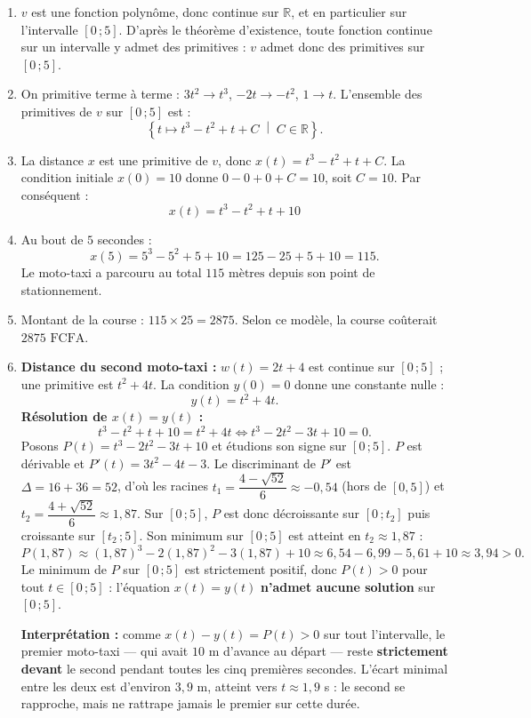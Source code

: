\documentclass[11pt]{article}
\begin{document}
\begin{corrige}
\begin{enumerate}
\item $v$ est une fonction polynôme, donc continue sur $\mathbb{R}$, et en particulier sur l'intervalle $[0\,;5]$. D'après le théorème d'existence, toute fonction continue sur un intervalle y admet des primitives : $v$ admet donc des primitives sur $[0\,;5]$.
\item On primitive terme à terme : $3t^2 \to t^3$, $-2t \to -t^2$, $1 \to t$. L'ensemble des primitives de $v$ sur $[0\,;5]$ est :
\[ \left\{ t \mapsto t^3 - t^2 + t + C \;\middle|\; C \in \mathbb{R} \right\}. \]
\item La distance $x$ est une primitive de $v$, donc $x(t) = t^3 - t^2 + t + C$. La condition initiale $x(0) = 10$ donne $0 - 0 + 0 + C = 10$, soit $C = 10$. Par conséquent :
\[ \boxed{x(t) = t^3 - t^2 + t + 10} \]
\item Au bout de $5$ secondes :
\[ x(5) = 5^3 - 5^2 + 5 + 10 = 125 - 25 + 5 + 10 = 115. \]
Le moto-taxi a parcouru au total $\boxed{115 \text{ mètres}}$ depuis son point de stationnement.
\item Montant de la course : $115 \times 25 = 2875$. Selon ce modèle, la course coûterait $\boxed{2875 \text{ FCFA}}$.
\item \textbf{Distance du second moto-taxi :} $w(t) = 2t + 4$ est continue sur $[0\,;5]$ ; une primitive est $t^2 + 4t$. La condition $y(0) = 0$ donne une constante nulle :
\[ y(t) = t^2 + 4t. \]
\textbf{Résolution de $x(t) = y(t)$ :}
\[ t^3 - t^2 + t + 10 = t^2 + 4t \iff t^3 - 2t^2 - 3t + 10 = 0. \]
Posons $P(t) = t^3 - 2t^2 - 3t + 10$ et étudions son signe sur $[0\,;5]$. $P$ est dérivable et $P'(t) = 3t^2 - 4t - 3$. Le discriminant de $P'$ est $\Delta = 16 + 36 = 52$, d'où les racines $t_1 = \dfrac{4 - \sqrt{52}}{6} \approx -0,54$ (hors de $[0,5]$) et $t_2 = \dfrac{4 + \sqrt{52}}{6} \approx 1,87$. Sur $[0\,;5]$, $P$ est donc décroissante sur $[0\,;t_2]$ puis croissante sur $[t_2\,;5]$. Son minimum sur $[0\,;5]$ est atteint en $t_2 \approx 1,87$ :
\[ P(1,87) \approx (1,87)^3 - 2(1,87)^2 - 3(1,87) + 10 \approx 6,54 - 6,99 - 5,61 + 10 \approx 3,94 > 0. \]
Le minimum de $P$ sur $[0\,;5]$ est strictement positif, donc $P(t) > 0$ pour tout $t \in [0\,;5]$ : l'équation $x(t) = y(t)$ \textbf{n'admet aucune solution} sur $[0\,;5]$.

\textbf{Interprétation :} comme $x(t) - y(t) = P(t) > 0$ sur tout l'intervalle, le premier moto-taxi — qui avait $10$ m d'avance au départ — reste \textbf{strictement devant} le second pendant toutes les cinq premières secondes. L'écart minimal entre les deux est d'environ $3,9$ m, atteint vers $t \approx 1,9$ s : le second se rapproche, mais ne rattrape jamais le premier sur cette durée.
\end{enumerate}
\end{corrige}
\end{document}
